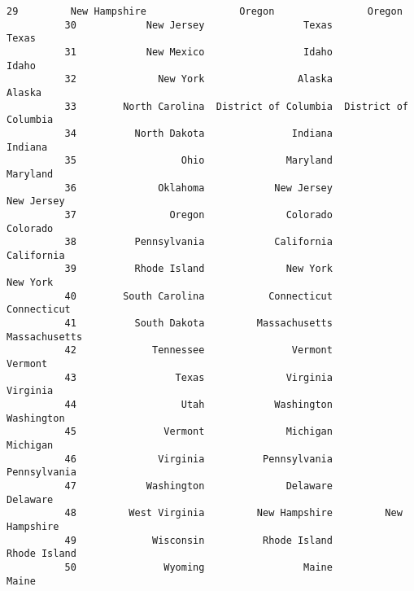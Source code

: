 \documentclass[11pt]{article}
\begin{document}
\begin{Verbatim}[commandchars=\\\{\}]
          29         New Hampshire                Oregon                Oregon   
          30            New Jersey                 Texas                 Texas   
          31            New Mexico                 Idaho                 Idaho   
          32              New York                Alaska                Alaska   
          33        North Carolina  District of Columbia  District of Columbia   
          34          North Dakota               Indiana               Indiana   
          35                  Ohio              Maryland              Maryland   
          36              Oklahoma            New Jersey            New Jersey   
          37                Oregon              Colorado              Colorado   
          38          Pennsylvania            California            California   
          39          Rhode Island              New York              New York   
          40        South Carolina           Connecticut           Connecticut   
          41          South Dakota         Massachusetts         Massachusetts   
          42             Tennessee               Vermont               Vermont   
          43                 Texas              Virginia              Virginia   
          44                  Utah            Washington            Washington   
          45               Vermont              Michigan              Michigan   
          46              Virginia          Pennsylvania          Pennsylvania   
          47            Washington              Delaware              Delaware   
          48         West Virginia         New Hampshire         New Hampshire   
          49             Wisconsin          Rhode Island          Rhode Island   
          50               Wyoming                 Maine                 Maine   
          

\end{Verbatim}
\end{document}

